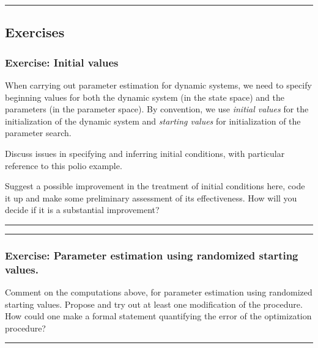 \documentclass[]{article}
\begin{document}
\begin{center}\rule{0.5\linewidth}{\linethickness}\end{center}

\subsection{Exercises}\label{exercises}

\subsubsection{Exercise: Initial values}\label{exercise-initial-values}

When carrying out parameter estimation for dynamic systems, we need to
specify beginning values for both the dynamic system (in the state
space) and the parameters (in the parameter space). By convention, we
use \emph{initial values} for the initialization of the dynamic system
and \emph{starting values} for initialization of the parameter search.

Discuss issues in specifying and inferring initial conditions, with
particular reference to this polio example.

Suggest a possible improvement in the treatment of initial conditions
here, code it up and make some preliminary assessment of its
effectiveness. How will you decide if it is a substantial improvement?

\begin{center}\rule{0.5\linewidth}{\linethickness}\end{center}

\begin{center}\rule{0.5\linewidth}{\linethickness}\end{center}

\subsubsection{Exercise: Parameter estimation using randomized starting
values.}\label{exercise-parameter-estimation-using-randomized-starting-values.}

Comment on the computations above, for parameter estimation using
randomized starting values. Propose and try out at least one
modification of the procedure. How could one make a formal statement
quantifying the error of the optimization procedure?

\begin{center}\rule{0.5\linewidth}{\linethickness}\end{center}
\end{document}
